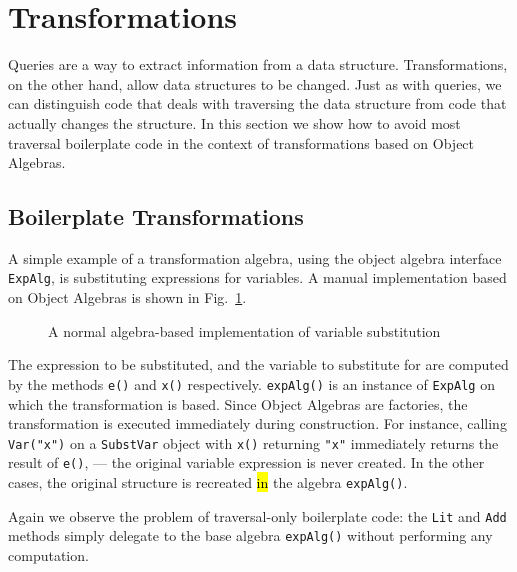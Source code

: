 \section{Transformations}\label{sec:transformations}
\label{retroimp}

Queries are a way to extract information from a data structure.
Transformations, on the other hand, allow data structures to be
changed. Just as with queries, we can distinguish code that deals with
traversing the data structure from code that actually changes the
structure. In this section we show how to avoid most traversal
boilerplate code in the context of transformations based on Object
Algebras.


\subsection{Boilerplate Transformations}\label{subsec:substvars}

A simple example of a transformation algebra, using the object
algebra interface \lstinline{ExpAlg}, is substituting expressions for
variables. A manual implementation based on Object Algebras is shown
in Fig.~\ref{substvars_without_id}.

\begin{figure}[t]
\nocaptionrule
\caption{A normal algebra-based implementation of variable substitution}
\label{substvars_without_id}
\end{figure}

The expression to be substituted, and the variable to substitute for
are computed by the methods \lstinline{e()} and \lstinline{x()}
respectively. \lstinline{expAlg()} is an instance of
\lstinline{ExpAlg} on which the transformation is based. Since Object
Algebras are factories, the transformation is executed immediately
during construction. For instance, calling \lstinline{Var("x")} on a
\lstinline{SubstVar} object with \lstinline{x()} returning
\lstinline{"x"} immediately returns the result of \lstinline{e()},
--- the original variable expression is never created. In the other
cases, the original structure is recreated \hl{in} the algebra
\lstinline{expAlg()}.

Again we observe the problem of traversal-only boilerplate code: the
\lstinline{Lit} and \lstinline{Add} methods simply delegate to the
base algebra \lstinline{expAlg()} without performing any computation.

